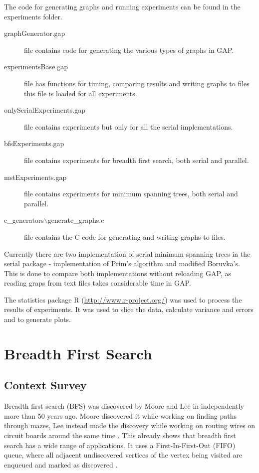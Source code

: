\documentclass{report}
\theoremstyle{plain}
\theoremstyle{definition}
\theoremstyle{remark}
\begin{document}
The code for generating graphs and running experiments can be found in the experiments folder.
\begin{description}
\item[graphGenerator.gap] file contains code for generating the various types of graphs in GAP.
\item[experimentsBase.gap] file has functions for timing, comparing results and writing graphs to files this file is loaded for all experiments.
\item[onlySerialExperiments.gap] file contains experiments but only for all the serial implementations.
\item[bfsExperiments.gap] file contains experiments for breadth first search, both serial and parallel.
\item[mstExperiments.gap] file contains experiments for minimum spanning trees, both serial and parallel.
\item[c\_generators$\backslash$generate\_graphs.c] file contains the C code for generating and writing graphs to files.
\end{description}

Currently there are two implementation of serial minimum spanning trees in the serial package - implementation of Prim's algorithm and modified Boruvka's. This is done to compare both implementations without reloading GAP, as reading graps from text files takes considerable time in GAP.

The statistics package R (\url{http://www.r-project.org/}) was used to process the results of experiments. It was used to slice the data, calculate variance and errors and to generate plots.

\chapter{Breadth First Search}

\section{Context Survey}

Breadth first search (BFS) was discovered by Moore and Lee in independently more than 50 years ago. Moore discovered it while working on finding paths through mazes, Lee instead made the discovery while working on routing wires on circuit boards around the same time \cite{cormen2001introduction}. This already shows that breadth first search has a wide range of applications. It uses a First-In-First-Out (FIFO) queue, where all adjacent undiscovered vertices of the vertex being visited are enqueued and marked as discovered \cite{c++_sedgewick}.
\end{document}
